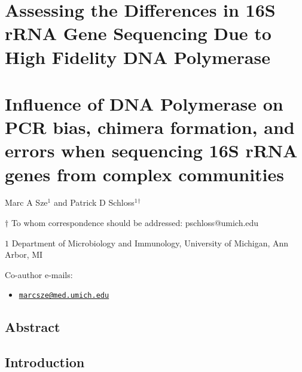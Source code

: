 \documentclass[11pt,]{article}
\title{}
\author{}
\date{}
\providecommand{\tightlist}{%
  \setlength{\itemsep}{0pt}\setlength{\parskip}{0pt}}
\begin{document}
\section{Assessing the Differences in 16S rRNA Gene Sequencing Due to
High Fidelity DNA
Polymerase}\label{assessing-the-differences-in-16s-rrna-gene-sequencing-due-to-high-fidelity-dna-polymerase}

\section{Influence of DNA Polymerase on PCR bias, chimera formation, and
errors when sequencing 16S rRNA genes from complex
communities}\label{influence-of-dna-polymerase-on-pcr-bias-chimera-formation-and-errors-when-sequencing-16s-rrna-genes-from-complex-communities}

\begin{center}
\vspace{25mm}

Marc A Sze${^1}$ and Patrick D Schloss${^1}$${^\dagger}$

\vspace{20mm}

$\dagger$ To whom correspondence should be addressed: pschloss@umich.edu

$1$ Department of Microbiology and Immunology, University of Michigan, Ann Arbor, MI




\end{center}

Co-author e-mails:

\begin{itemize}
\tightlist
\item
  \href{mailto:marcsze@med.umich.edu}{\nolinkurl{marcsze@med.umich.edu}}
\end{itemize}

\newpage

\linenumbers

\subsection{Abstract}\label{abstract}

\newpage

\subsection{Introduction}\label{introduction}
\end{document}
